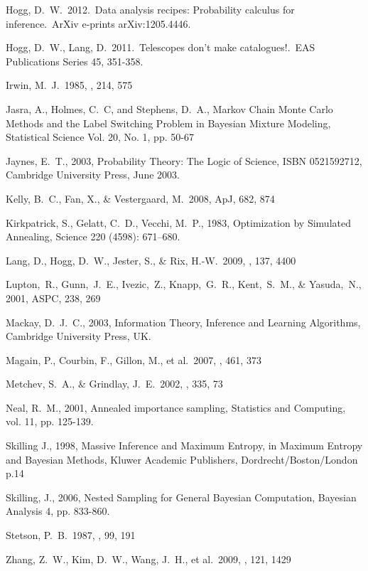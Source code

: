 \documentclass[12pt, preprint]{aastex}
\begin{document}
\begin{thebibliography}{99}
 Hogg, D.~W.\ 2012.\ Data analysis
recipes: Probability calculus for inference.\ ArXiv e-prints
arXiv:1205.4446.

 Hogg, D.~W., Lang, D.\
2011.\ Telescopes don't make catalogues!.\ EAS Publications Series 45,
351-358.

 Irwin, M.~J.\ 1985, \mnras, 214,
575

 Jasra, A., Holmes, C.~C, and
Stephens, D.~A., Markov Chain Monte Carlo Methods and the Label Switching
Problem in Bayesian Mixture Modeling, Statistical Science
Vol. 20, No. 1, pp. 50-67

 Jaynes, E.~T., 2003, Probability Theory: The
Logic of Science, ISBN 0521592712, Cambridge University Press, June 2003.

 Kelly, B.~C., Fan, X.,
\& Vestergaard, M.\ 2008, ApJ, 682, 874

Kirkpatrick, S., Gelatt, C.~D., Vecchi, M.~P., 1983,
Optimization by Simulated Annealing, Science 220 (4598): 671–680.

 Lang, D., Hogg, D.~W., 
Jester, S., \& Rix, H.-W.\ 2009, \aj, 137, 4400 

Lupton,~R., Gunn,~J.~E., Ivezic,~Z., Knapp,~G.~R., Kent,~S.~M., \& Yasuda,~N., 2001, ASPC, 238, 269

 Mackay, D.~J.~C., 2003, Information Theory,
Inference and Learning Algorithms, Cambridge University Press, UK.

 Magain, P., Courbin, F., Gillon, M., et al.\ 2007, \aap, 461, 373 

 Metchev, S.~A., \& Grindlay, J.~E.\ 2002, \mnras, 335, 73 

 Neal, R.~M., 2001, 
Annealed importance sampling, Statistics and Computing, vol. 11, pp. 125-139.

Skilling J., 1998, Massive Inference and Maximum Entropy, in Maximum Entropy
and Bayesian Methods, Kluwer Academic Publishers, Dordrecht/Boston/London p.14

 Skilling, J., 2006, Nested Sampling for General Bayesian Computation, Bayesian Analysis 4, pp. 833-860.

 Stetson, P.~B.\ 1987, \pasp,
99, 191

 Zhang, Z.~W., Kim, D.~W., 
Wang, J.~H., et al.\ 2009, \pasp, 121, 1429 
\end{thebibliography}
\end{document}
